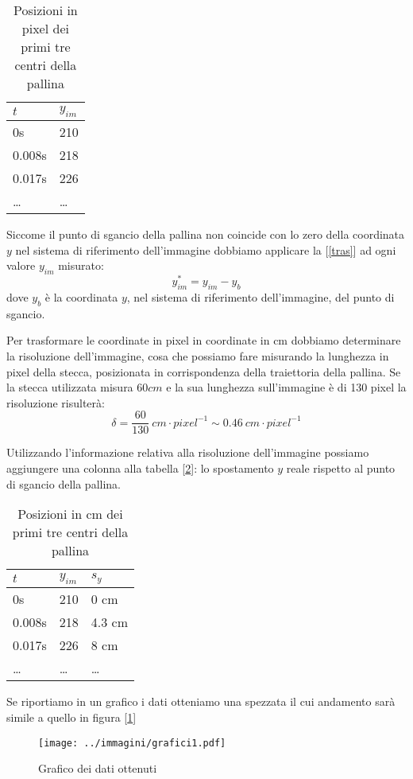 \documentclass[a4paper,10pt,oneside]{article}
\begin{document}
\begin{table}[H]
\begin{center}
\begin{tabular}{ll}\toprule
$t$& $y_{im}$\\ \midrule
0s& 210\\
0.008s&218\\
0.017s&226\\
\ldots&\ldots \\ \bottomrule
\end{tabular}\caption{Posizioni in pixel dei primi tre centri della pallina}\label{tab:postab1}
\end{center}
\end{table}
Siccome il punto di sgancio della pallina non coincide con lo zero della coordinata $y$ nel sistema di riferimento dell'immagine dobbiamo applicare la [\ref{tras}] ad ogni valore $y_{im}$ misurato:
\begin{equation}\label{tras}
 y^*_{im}=y_{im}-y_b
\end{equation}
dove $y_b$ è la coordinata $y$,  nel sistema di riferimento dell'immagine, del punto di sgancio.

Per trasformare le coordinate in pixel in coordinate in cm dobbiamo determinare la risoluzione dell'immagine, cosa che possiamo fare misurando la lunghezza in pixel della stecca,  posizionata in corrispondenza della traiettoria della pallina. 
Se la stecca utilizzata misura $60cm$  e la sua lunghezza sull'immagine è di 130 pixel la risoluzione risulterà:
\begin{equation}
 \delta=\frac{60}{130}\ cm\cdot pixel^{-1}\sim 0.46\ cm\cdot pixel ^{-1}
\end{equation}


 Utilizzando l'informazione relativa alla risoluzione dell'immagine possiamo aggiungere una colonna alla tabella [\ref{tab:postab1}]: lo spostamento $y$ reale rispetto al punto di sgancio della pallina.
\begin{table}[H]
\begin{center}
\begin{tabular}{lll}\toprule
$t$& $y_{im}$ & $s_y$\\ \midrule
0s& 210&0 cm\\
0.008s&218&4.3 cm\\
0.017s&226&8 cm\\
\ldots&\ldots&\ldots\\ \bottomrule
\end{tabular}\caption{Posizioni in cm dei primi tre centri della pallina}\label{tab:postab1}
\end{center}
\end{table}
Se riportiamo in un grafico i dati otteniamo una spezzata il cui andamento sarà simile a quello in figura [\ref{fig:grafico_dati}]
\begin{figure}[H]
 \centering
 \texttt{[image: ../immagini/grafici1.pdf]}
 \caption{Grafico dei dati ottenuti}
 \label{fig:grafico_dati}
\end{figure}
\end{document}
